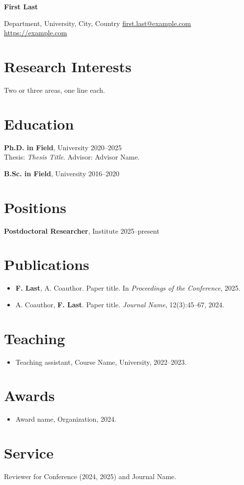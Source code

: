 \documentclass[11pt,a4paper]{article}
\begin{document}
{\LARGE\bfseries First Last}\par
\medskip
Department, University, City, Country \quad
\href{mailto:first.last@example.com}{first.last@example.com} \quad
\url{https://example.com}

\section*{Research Interests}
Two or three areas, one line each.

\section*{Education}
\textbf{Ph.D. in Field}, University \hfill 2020--2025\\
Thesis: \emph{Thesis Title}. Advisor: Advisor Name.

\textbf{B.Sc. in Field}, University \hfill 2016--2020

\section*{Positions}
\textbf{Postdoctoral Researcher}, Institute \hfill 2025--present

\section*{Publications}
\begin{itemize}
  \item \textbf{F. Last}, A. Coauthor. Paper title. In \emph{Proceedings of the Conference}, 2025.
  \item A. Coauthor, \textbf{F. Last}. Paper title. \emph{Journal Name}, 12(3):45--67, 2024.
\end{itemize}

\section*{Teaching}
\begin{itemize}
  \item Teaching assistant, Course Name, University, 2022--2023.
\end{itemize}

\section*{Awards}
\begin{itemize}
  \item Award name, Organization, 2024.
\end{itemize}

\section*{Service}
Reviewer for Conference (2024, 2025) and Journal Name.
\end{document}

